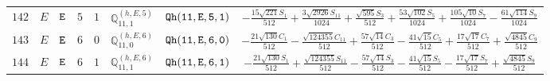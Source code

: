 \documentclass[fleqn,8pt]{jsarticle}
\begin{document}
\begin{table}[ht!]
\begin{center}
\begin{tabular}{cccccccc}
$ 142 $ & $ E $ & $ {\tt E} $ & $ 5 $ & $ 1 $ & $ \mathbb{Q}_{11,1}^{(h,E,5)} $ & $ {\tt Qh(11,E,5,1)} $ & $ - \frac{15 \sqrt{221} S_{1}}{512} + \frac{3 \sqrt{2926} S_{11}}{1024} + \frac{\sqrt{595} S_{3}}{512} + \frac{53 \sqrt{102} S_{5}}{1024} + \frac{105 \sqrt{10} S_{7}}{1024} - \frac{61 \sqrt{114} S_{9}}{1024} $ \\
$ 143 $ & $ E $ & $ {\tt E} $ & $ 6 $ & $ 0 $ & $ \mathbb{Q}_{11,0}^{(h,E,6)} $ & $ {\tt Qh(11,E,6,0)} $ & $ - \frac{21 \sqrt{130} C_{1}}{512} - \frac{\sqrt{124355} C_{11}}{512} + \frac{57 \sqrt{14} C_{3}}{512} - \frac{41 \sqrt{15} C_{5}}{512} + \frac{17 \sqrt{17} C_{7}}{512} + \frac{\sqrt{4845} C_{9}}{512} $ \\
$ 144 $ & $ E $ & $ {\tt E} $ & $ 6 $ & $ 1 $ & $ \mathbb{Q}_{11,1}^{(h,E,6)} $ & $ {\tt Qh(11,E,6,1)} $ & $ - \frac{21 \sqrt{130} S_{1}}{512} + \frac{\sqrt{124355} S_{11}}{512} - \frac{57 \sqrt{14} S_{3}}{512} - \frac{41 \sqrt{15} S_{5}}{512} - \frac{17 \sqrt{17} S_{7}}{512} + \frac{\sqrt{4845} S_{9}}{512} $ \\
 \hline \hline
\end{tabular}
\end{center}
\end{table}
\end{document}

